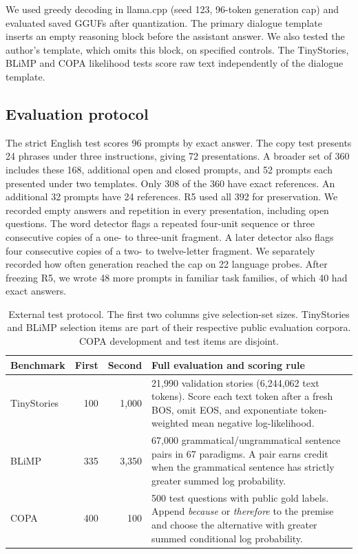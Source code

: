 \documentclass[11pt]{article}
\begin{document}
We used greedy decoding in llama.cpp (seed 123, 96-token generation cap) and evaluated saved GGUFs after quantization. The primary dialogue template inserts an empty reasoning block before the assistant answer. We also tested the author's template, which omits this block, on specified controls. The TinyStories, BLiMP and COPA likelihood tests score raw text independently of the dialogue template.

\subsection{Evaluation protocol}
The strict English test scores 96 prompts by exact answer. The copy test presents 24 phrases under three instructions, giving 72 presentations. A broader set of 360 includes these 168, additional open and closed prompts, and 52 prompts each presented under two templates. Only 308 of the 360 have exact references. An additional 32 prompts have 24 references. R5 used all 392 for preservation. We recorded empty answers and repetition in every presentation, including open questions. The word detector flags a repeated four-unit sequence or three consecutive copies of a one- to three-unit fragment. A later detector also flags four consecutive copies of a two- to twelve-letter fragment. We separately recorded how often generation reached the cap on 22 language probes. After freezing R5, we wrote 48 more prompts in familiar task families, of which 40 had exact answers.

\begin{table}[tbp]\centering\small
\caption{External test protocol. The first two columns give selection-set sizes. TinyStories and BLiMP selection items are part of their respective public evaluation corpora. COPA development and test items are disjoint.}\label{tab:data}
\begin{tabularx}{\linewidth}{@{}lrrX@{}}\toprule
Benchmark & First & Second & Full evaluation and scoring rule\\\midrule
TinyStories & 100 & 1,000 & 21,990 validation stories (6,244,062 text tokens). Score each text token after a fresh BOS, omit EOS, and exponentiate token-weighted mean negative log-likelihood.\\
BLiMP & 335 & 3,350 & 67,000 grammatical/ungrammatical sentence pairs in 67 paradigms. A pair earns credit when the grammatical sentence has strictly greater summed log probability.\\
COPA & 400 & 100 & 500 test questions with public gold labels. Append \emph{because} or \emph{therefore} to the premise and choose the alternative with greater summed conditional log probability.\\\bottomrule
\end{tabularx}
\end{table}
\end{document}
